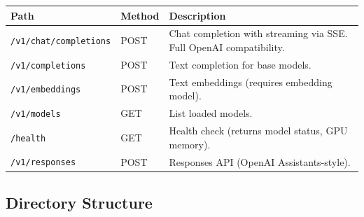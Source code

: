 \documentclass[11pt,a4paper]{article}
\begin{document}
\begin{longtable}{@{}L{4.5cm}L{1.5cm}L{7.5cm}@{}}
\toprule
\textbf{Path} & \textbf{Method} & \textbf{Description} \\
\midrule
\endhead
\texttt{/v1/chat/completions} & POST & Chat completion with streaming via SSE. Full OpenAI compatibility. \\
\texttt{/v1/completions} & POST & Text completion for base models. \\
\texttt{/v1/embeddings} & POST & Text embeddings (requires embedding model). \\
\texttt{/v1/models} & GET & List loaded models. \\
\texttt{/health} & GET & Health check (returns model status, GPU memory). \\
\texttt{/v1/responses} & POST & Responses API (OpenAI Assistants-style). \\
\bottomrule
\end{longtable}

\subsection{Directory Structure}
\end{document}
